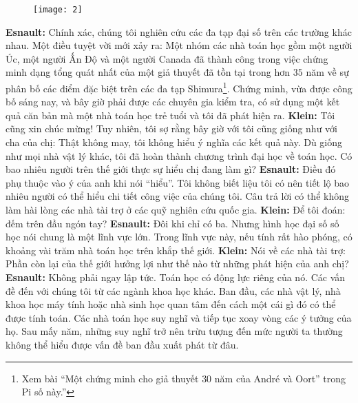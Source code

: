 \begin{multicols}{2}
	\begin{figure}[H]
		\centering
		\vspace*{-5pt}
		\captionsetup{labelformat= empty, justification=centering}
		\texttt{[image: 2]}
		\vspace*{-10pt}
	\end{figure}
	\textbf{\color{doithoaitoanhoc}Esnault:} Chính xác, chúng tôi nghiên cứu các đa tạp đại số trên các trường khác nhau. Một điều tuyệt vời mới xảy ra: Một nhóm các nhà toán học gồm một người Úc, một người Ấn Độ và một người Canada đã thành công trong việc chứng minh dạng tổng quát nhất của một giả thuyết đã tồn tại trong hơn $35$ năm về sự phân bố các điểm đặc biệt trên các đa tạp Shimura\footnote{\color{doithoaitoanhoc}Xem bài “Một chứng minh cho giả thuyết $30$ năm của André và Oort” trong Pi số này.”}. Chứng minh, vừa được công bố sáng nay, và bây giờ phải được các chuyên gia kiểm tra, có sử dụng một kết quả căn bản mà một nhà toán học trẻ tuổi và tôi đã phát hiện ra. 
	\vskip 0.1cm
	\textbf{\color{doithoaitoanhoc}Klein:} Tôi cũng xin chúc mừng! Tuy nhiên, tôi sợ rằng bây giờ với tôi cũng giống như với cha của chị: Thật không may, tôi không hiểu ý nghĩa các kết quả này. Dù giống như mọi nhà vật lý khác, tôi đã hoàn thành chương \linebreak trình đại học về toán học. Có bao nhiêu người trên thế giới thực sự hiểu chị đang làm gì?
	\vskip 0.1cm
	\textbf{\color{doithoaitoanhoc}Esnault:} Điều đó phụ thuộc vào ý của anh khi nói “hiểu”. Tôi không biết liệu tôi có nên tiết lộ bao nhiêu người có thể hiểu chi tiết công việc của chúng tôi. Câu trả lời có thể không làm hài lòng các nhà tài trợ ở các quỹ nghiên cứu quốc gia.
	\vskip 0.1cm
	\textbf{\color{doithoaitoanhoc}Klein:} Để tôi đoán: đếm trên đầu ngón tay?
	\vskip 0.1cm
	\textbf{\color{doithoaitoanhoc}Esnault:} Đôi khi chỉ có ba. Nhưng hình học đại số số học nói chung là một lĩnh vực lớn. Trong lĩnh vực này, nếu tính rất hào phóng, có khoảng vài trăm nhà toán học trên khắp thế giới.
	\vskip 0.1cm
	\textbf{\color{doithoaitoanhoc}Klein:} Nói về các nhà tài trợ: Phần còn lại của thế giới hưởng lợi như thế nào từ những phát hiện của anh chị?
	\vskip 0.1cm
	\textbf{\color{doithoaitoanhoc}Esnault:} Không phải ngay lập tức. Toán học có động lực riêng của nó. Các vấn đề đến với chúng tôi từ các ngành khoa học khác. Ban đầu, các nhà vật lý, nhà khoa học máy tính hoặc nhà sinh học quan tâm đến cách một cái gì đó có thể được tính toán. Các nhà toán học suy nghĩ và tiếp tục xoay vòng các ý tưởng của họ. Sau mấy năm, những suy nghĩ trở nên trừu tượng đến mức người ta thường không thể hiểu được vấn đề ban đầu xuất phát \linebreak từ đâu.

\end{multicols}
